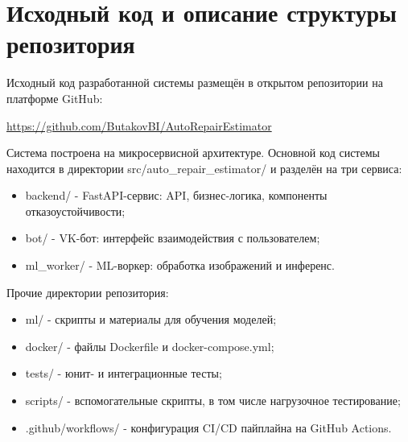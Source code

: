 \chapter{Исходный код и описание структуры репозитория}\label{app:A}

Исходный код разработанной системы размещён в открытом репозитории на платформе GitHub:

\begin{center}
\url{https://github.com/ButakovBI/AutoRepairEstimator}
\end{center}

Система построена на микросервисной архитектуре. Основной код системы
находится в директории src/auto\_repair\_estimator/ и разделён на три сервиса:

\begin{itemize}
    \item backend/ - FastAPI-сервис: API, бизнес-логика, компоненты отказоустойчивости;
    \item bot/ - VK-бот: интерфейс взаимодействия с пользователем;
    \item ml\_worker/ - ML-воркер: обработка изображений и инференс.
\end{itemize}

Прочие директории репозитория:

\begin{itemize}
    \item ml/ - скрипты и материалы для обучения моделей;
    \item docker/ - файлы Dockerfile и docker-compose.yml;
    \item tests/ - юнит- и интеграционные тесты;
    \item scripts/ - вспомогательные скрипты, в том числе нагрузочное тестирование;
    \item .github/workflows/ - конфигурация CI/CD пайплайна на GitHub Actions.
\end{itemize}
